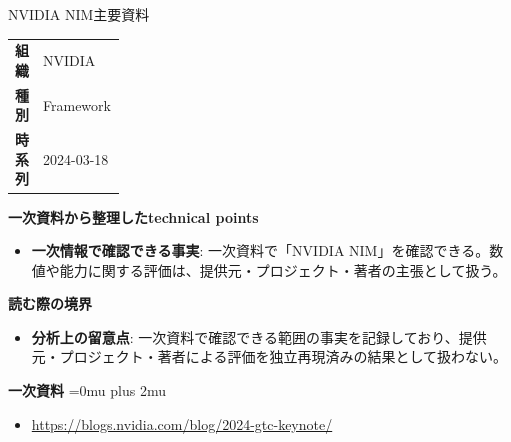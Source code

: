 \begin{technicalnote}{NVIDIA NIM}{主要資料}
\begingroup
\begin{tabularx}{\linewidth}{@{}>{\bfseries}p{0.22\linewidth}X@{}}
組織 & NVIDIA \\
種別 & Framework \\
時系列 & 2024-03-18 \\
\end{tabularx}
\smallskip
{\bfseries 一次資料から整理したtechnical points}
\begin{itemize}[leftmargin=1.5em,itemsep=0.35em]
\item \textbf{一次情報で確認できる事実}: 一次資料で「NVIDIA NIM」を確認できる。数値や能力に関する評価は、提供元・プロジェクト・著者の主張として扱う。
\end{itemize}
\begin{minipage}{\linewidth}
{\bfseries 読む際の境界}
\begin{itemize}[leftmargin=1.5em,itemsep=0.35em]
\item \textbf{分析上の留意点}: 一次資料で確認できる範囲の事実を記録しており、提供元・プロジェクト・著者による評価を独立再現済みの結果として扱わない。
\end{itemize}
\begin{samepage}
{\bfseries 一次資料}
\begingroup\sloppy
\Urlmuskip=0mu plus 2mu\relax
\begin{itemize}[leftmargin=1.5em,itemsep=0.25em]
\item {\scriptsize\url{https://blogs.nvidia.com/blog/2024-gtc-keynote/}}
\end{itemize}
\endgroup
\end{samepage}
\end{minipage}
\endgroup
\end{technicalnote}
\medskip

